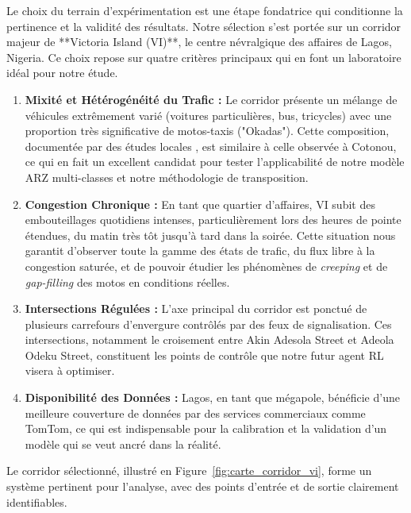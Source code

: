 Le choix du terrain d'expérimentation est une étape fondatrice qui conditionne la pertinence et la validité des résultats. Notre sélection s'est portée sur un corridor majeur de **Victoria Island (VI)**, le centre névralgique des affaires de Lagos, Nigeria. Ce choix repose sur quatre critères principaux qui en font un laboratoire idéal pour notre étude.

\begin{enumerate}
    \item \textbf{Mixité et Hétérogénéité du Trafic :} Le corridor présente un mélange de véhicules extrêmement varié (voitures particulières, bus, tricycles) avec une proportion très significative de motos-taxis ("Okadas"). Cette composition, documentée par des études locales \parencite{LUDI:2020}, est similaire à celle observée à Cotonou, ce qui en fait un excellent candidat pour tester l'applicabilité de notre modèle ARZ multi-classes et notre méthodologie de transposition.

    \item \textbf{Congestion Chronique :} En tant que quartier d'affaires, VI subit des embouteillages quotidiens intenses, particulièrement lors des heures de pointe étendues, du matin très tôt jusqu'à tard dans la soirée. Cette situation nous garantit d'observer toute la gamme des états de trafic, du flux libre à la congestion saturée, et de pouvoir étudier les phénomènes de \textit{creeping} et de \textit{gap-filling} des motos en conditions réelles.

    \item \textbf{Intersections Régulées :} L'axe principal du corridor est ponctué de plusieurs carrefours d'envergure contrôlés par des feux de signalisation. Ces intersections, notamment le croisement entre Akin Adesola Street et Adeola Odeku Street, constituent les points de contrôle que notre futur agent RL visera à optimiser.

    \item \textbf{Disponibilité des Données :} Lagos, en tant que mégapole, bénéficie d'une meilleure couverture de données par des services commerciaux comme TomTom, ce qui est indispensable pour la calibration et la validation d'un modèle qui se veut ancré dans la réalité.
\end{enumerate}

Le corridor sélectionné, illustré en Figure~\ref{fig:carte_corridor_vi}, forme un système pertinent pour l'analyse, avec des points d'entrée et de sortie clairement identifiables.

